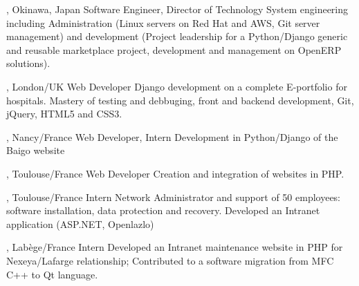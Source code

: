 \documentclass[english]{ecv}
\begin{document}
\begin{ecv}
                 {, Okinawa, Japan}
                {Software Engineer, Director of Technology}
        {System engineering including Administration (Linux servers on
          Red Hat and AWS, Git server management) and development
          (Project leadership for a Python/Django generic and reusable
          marketplace project, development and management on OpenERP solutions).}


                 {, London/UK}
                 {Web Developer}
                 {Django development on a complete E-portfolio for hospitals.
                   Mastery of testing and debbuging, front and backend
                   development, Git, jQuery, HTML5 and CSS3.
                 }

                 {, Nancy/France}
                 {Web Developer, Intern}
                 {Development in Python/Django of the Baigo website
                 }

                 {, Toulouse/France}
                 {Web Developer}
                 {Creation and integration of websites in PHP.
                 }

                 {, Toulouse/France}
                 {Intern
                 }
                 {Network Administrator and support of 50 employees: software
                   installation, data protection and recovery. Developed an
                   Intranet application (ASP.NET, Openlazlo)
                 }

                 {, Lab\`ege/France}
                 {Intern
                 }
                 {Developed an Intranet maintenance website in PHP for Nexeya/Lafarge
                  relationship; Contributed to a software migration from MFC C++
                  to Qt language.
                 }


\end{ecv}
\end{document}
